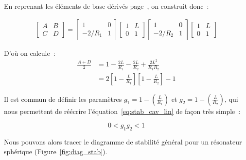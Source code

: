 \documentclass[a4paper]{book}
\begin{document}
En reprenant les éléments de base dérivés page~\pageref{subsec:el_base}, on construit donc~:

\begin{gather}
  \begin{bmatrix}
   A & B \\
   C & D 
   \end{bmatrix}
   =
  \begin{bmatrix}
   1 & 0 \\
   -2/R_1 & 1 
  \end{bmatrix}
  \begin{bmatrix}
   1 & L \\
   0 & 1 
   \end{bmatrix}
  \begin{bmatrix}
   1 & 0 \\
   -2/R_2 & 1 
  \end{bmatrix}
  \begin{bmatrix}
   1 & L \\
   0 & 1 
   \end{bmatrix}
\end{gather}

D'où on calcule~:
\begin{align}
\label{eq:stab_cav_lin}
    \frac{A+D}{2}&=1-\frac{2L}{R_1}-\frac{2L}{R_2}+\frac{2L^2}{R_1R_2}\\
                 &=2\left[1-\frac{L}{R_1}\right]\left[1-\frac{L}{R_2}\right]-1
\end{align}

Il est commun de définir les paramètres $g_1 = 1 -\left(\frac{L}{R_1}\right)$ et $g_2 = 1 -\left(\frac{L}{R_2}\right)$, qui nous permettent de réécrire l'équation~\ref{eq:stab_cav_lin} de façon très simple~:

\begin{equation}
    0<g_1g_2<1
\end{equation}

Nous pouvons alors tracer le diagramme de stabilité général pour un résonateur sphérique (Figure~\ref{fig:diag_stab}). 
\end{document}
